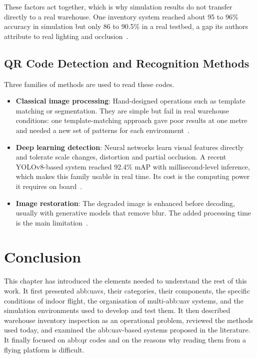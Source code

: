 These factors act together, which is why simulation results do not transfer
directly to a real warehouse. One inventory system reached about 95 to 96\%
accuracy in simulation but only 86 to 90.5\% in a real testbed, a gap its authors
attribute to real lighting and occlusion~\cite{pore2026uavqr}.

\subsection{QR Code Detection and Recognition Methods}%
\label{subsec:bg:qr-detection}

Three families of methods are used to read these codes.

\begin{itemize}[itemsep=0.5em]
    \item \textbf{Classical image processing}: Hand-designed operations such as
          template matching or segmentation. They are simple but fail in real
          warehouse conditions: one template-matching approach gave poor results
          at one metre and needed a new set of patterns for each
          environment~\cite{kalinov2020warevision}.
    \item \textbf{Deep learning detection}: Neural networks learn visual features
          directly and tolerate scale changes, distortion and partial occlusion.
          A recent YOLOv8-based system reached 92.4\% mAP with millisecond-level
          inference, which makes this family usable in real time. Its cost is the
          computing power it requires on board~\cite{alsulami2026deep}.
    \item \textbf{Image restoration}: The degraded image is enhanced before
          decoding, usually with generative models that remove blur. The added
          processing time is the main
          limitation~\cite{dong2024motionblurred}.
\end{itemize}

\section{Conclusion}%
\label{sec:bg:conclusion}

This chapter has introduced the elements needed to understand the rest of this
work. It first presented \glspl{abb:uav}, their categories, their components, the
specific conditions of indoor flight, the organisation of multi-\gls{abb:uav}
systems, and the simulation environments used to develop and test them. It then
described warehouse inventory inspection as an operational problem, reviewed the
methods used today, and examined the \gls{abb:uav}-based systems proposed in the
literature. It finally focused on \gls{abb:qr} codes and on the reasons why
reading them from a flying platform is difficult.

